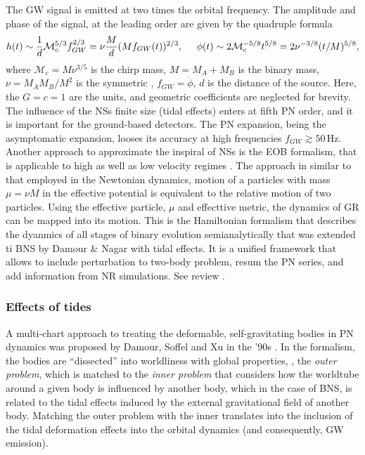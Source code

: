 The \ac{GW} signal is emitted at two times the orbital frequency. The amplitude and phase of 
the signal, at the leading order are given by the quadruple formula 
%
\begin{equation}
    h(t) \sim \frac{1}{d}\mathcal{M}_c^{5/3} f_{GW}^{2/3} = \nu\frac{M}{d}(Mf_{GW}(t))^{2/3}, \hspace{5mm} \phi(t) \sim 2\mathcal{M}_c^{-5/8}t^{5/8} = 2\nu^{-3/8}(t/M)^{5/8},
\end{equation}
%
where $\mathcal{M}_c = M\nu^{3/5}$ is the chirp mass, $M=M_A + M_B$ is the binary mass, 
$\nu=M_A M_B/M^2$ is the symmetric \mr{}, $f_{GW} = \dot{\phi}$, $d$ is the distance of the source.
Here, the $G=c=1$ are the units, and geometric coefficients are neglected for brevity. 
%
The influence of the \acp{NS} finite size (tidal effects) enters at fifth \ac{PN} order, 
and it is important for the ground-based detectors. 
%
The \ac{PN} expansion, being the asymptomatic expansion, looses its accuracy at high 
frequencies $f_{GW}\gtrsim 50\,$Hz. 
%
Another approach to approximate the inspiral of \acp{NS} is the \ac{EOB} formalism, that 
is applicable to high as well as low velocity regimes \cite{28}.
The approach in similar to that employed in the Newtonian dynamics, motion of a particles 
with mass $\mu=\nu M$ in the effective potential is equivalent to the relative motion of two 
particles. Using the effective particle, $\mu$ and effecttive metric, the dynamics of 
\ac{GR} can be mapped into its motion. 
This is the Hamiltonian formalism that describes the dyanmics of all stages of binary evolution 
semianalytically that was extended ti \ac{BNS} by Damour \& Nagar \cite{29} with tidal effects.
It is a unified framework that allows to include perturbation to two-body problem, 
resum the \ac{PN} series, and add information from \ac{NR} simulations. See review \cite{30}.

\subsubsection{Effects of tides}

A multi-chart approach to treating the deformable, self-gravitating bodies in \ac{PN} dynamics 
was proposed by Damour, Soffel and Xu in the '90s \cite{31}. In the formalism, the bodies are 
``dissected''  into worldliness with global properties, \ie, the \textit{outer problem}, 
which is matched to the \textit{inner problem} that considers how the worldtube around a given 
body is influenced by another body, which in the case of \ac{BNS}, is related to the 
tidal effects induced by the external gravitational field of another body.
Matching the outer problem with the inner translates into the inclusion of the tidal 
deformation effects into the orbital dynamics (and consequently, \ac{GW} emission). 

